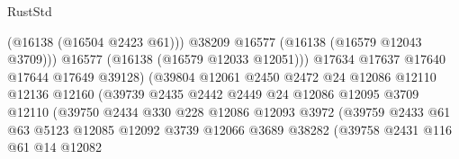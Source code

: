 \begin{lexlean}{RustStd}
\begin{coremodule}
                                            (@16138 (@16504 @2423 @61)))
                                          @38209
                                          @16577
                                          (@16138 (@16579 @12043 @3709)))
                                        @16577
                                        (@16138 (@16579 @12033 @12051)))
                                      @17634
                                      @17637
                                      @17640
                                      @17644
                                      @17649
                                      @39128)
                                    (@39804
                                      @12061
                                      @2450
                                      @2472
                                      @24
                                      @12086
                                      @12110
                                      @12136
                                      @12160
                                      (@39739
                                        @2435
                                        @2442
                                        @2449
                                        @24
                                        @12086
                                        @12095
                                        @3709
                                        @12110
                                        (@39750
                                          @2434
                                          @330
                                          @228
                                          @12086
                                          @12093
                                          @3972
                                          (@39759
                                            @2433
                                            @61
                                            @63
                                            @5123
                                            @12085
                                            @12092
                                            @3739
                                            @12066
                                            @3689
                                            @38282
                                            (@39758
                                              @2431
                                              @116
                                              @61
                                              @14
                                              @12082

\end{coremodule}
\end{lexlean}
